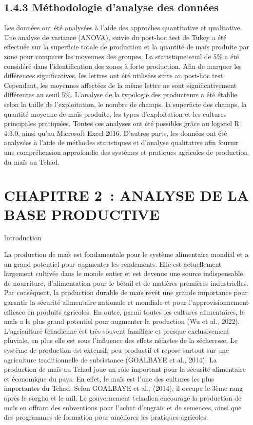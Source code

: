 \documentclass[12pt,oneside]{report}
\begin{document}
\subsection{1.4.3 Méthodologie d’analyse des données}
Les données ont été analysées à l'aide des approches quantitative et qualitative. Une analyse de variance (ANOVA), suivie du post-hoc test de Tukey a été effectuée sur la superficie totale de production et la quantité de maïs produite par zone pour comparer les moyennes des groupes. La statistique seuil de 5\% a été considéré dans l’identification des zones à forte production. Afin de marquer les différences significatives, les lettres ont été utilisées suite au post-hoc test. Cependant, les moyennes affectées de la même lettre ne sont significativement différentes au seuil 5\%. L’analyse de la typologie des producteurs a été établie selon la taille de l’exploitation, le nombre de champs, la superficie des champs, la quantité moyenne de maïs produite, les types d’exploitation et les cultures principales pratiquées. Toutes ces analyses ont été possibles grâce au logiciel R 4.3.0, ainsi qu’au Microsoft Excel 2016. D’autres parts, les données ont été analysées à l'aide de méthodes statistiques et d'analyse qualitative afin fournir une compréhension approfondie des systèmes et pratiques agricoles de production du maïs au Tchad.

\section{CHAPITRE 2 : ANALYSE DE LA BASE PRODUCTIVE}
Introduction

La production de maïs est fondamentale pour le système alimentaire mondial et a un grand potentiel pour augmenter les rendements. Elle est actuellement largement cultivée dans le monde entier et est devenue une source indispensable de nourriture, d'alimentation pour le bétail et de matières premières industrielles. Par conséquent, la production durable de maïs revêt une grande importance pour garantir la sécurité alimentaire nationale et mondiale et pour l'approvisionnement efficace en produits agricoles. En outre, parmi toutes les cultures alimentaires, le maïs a le plus grand potentiel pour augmenter la production (Wu et al., 2022). L’agriculture tchadienne est très souvent familiale et presque exclusivement pluviale, en plus elle est sous l’influence des effets néfastes de la sécheresse. Le système de production est extensif, peu productif et repose surtout sur une agriculture traditionnelle de subsistance (GOALBAYE et al., 2014). La production de maïs au Tchad joue un rôle important pour la sécurité alimentaire et économique du pays. En effet, le maïs est l'une des cultures les plus importantes du Tchad. Selon GOALBAYE et al., (2014), il occupe le 3ème rang après le sorgho et le mil. Le gouvernement tchadien encourage la production de maïs en offrant des subventions pour l'achat d'engrais et de semences, ainsi que des programmes de formation pour améliorer les pratiques agricoles.
\end{document}
